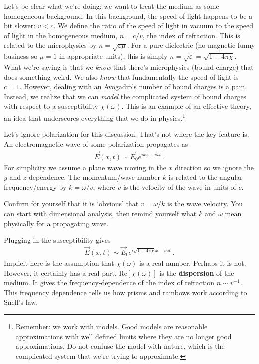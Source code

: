 Let's be clear what we're doing: we want to treat the medium as some homogeneous background. In this background, the speed of light happens to be a bit slower: $v < c$. We define the ratio of the speed of light in vacuum to the speed of light in the homogeneous medium, $n = c/v$, the index of refraction. This is related to the microphysics by $n = \sqrt{\varepsilon\mu}$. For a pure dielectric (no magnetic funny business so $\mu=1$ in appropriate units), this is simply $n=\sqrt{\varepsilon} = \sqrt{1+4\pi\chi}$. What we're saying is that we \emph{know} that there's microphysics (bound charge) that does something weird. We also \emph{know} that fundamentally the speed of light is $c=1$. However, dealing with an Avogadro's number of bound charges is a pain. Instead, we realize that we can \emph{model} the complicated system of bound charges with respect to a susceptibility $\chi(\omega)$. This is an example of an effective theory, an idea that underscores everything that we do in physics.\footnote{Remember: we work with models. Good models are reasonable approximations with well defined limits where they are no longer good approximations. Do not confuse the model with nature, which is the complicated system that we're trying to approximate.}

Let's ignore polarization for this discussion. That's not where the key feature is. An electromagnetic wave of some polarization propagates as
\begin{align}
	\vec E(x,t) \sim \vec{E}_0 e^{ikx - i\omega t} \ .
\end{align}
For simplicity we assume a plane wave moving in the $x$ direction so we ignore the $y$ and $z$ dependence. The momentum/wave number $k$ is related to the angular frequency/energy by $k = \omega/v$, where $v$ is the velocity of the wave in units of $c$.
\begin{exercise}
Confirm for yourself that it is `obvious' that $v = \omega/k$ is the wave velocity. You can start with dimensional analysis, then remind yourself what $k$ and $\omega$ mean physically for a propagating wave.
\end{exercise}
Plugging in the susceptibility gives 
\begin{align}
	\vec E(x,t) \sim \vec{E}_0 e^{i\sqrt{1+4\pi \chi}x - i\omega t} \ .
\end{align}
Implicit here is the assumption that $\chi(\omega)$ is a real number. Perhaps it is not. However, it certainly has a real part. $\text{Re}[\chi(\omega)]$ is the \textbf{dispersion} of the medium. It gives the frequency-dependence of the index of refraction $n\sim v^{-1}$. This frequency dependence tells us how prisms and rainbows work according to Snell's law.

